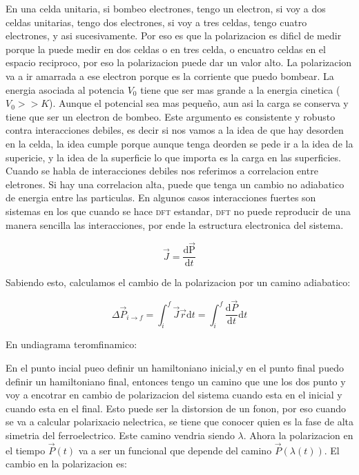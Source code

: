 \documentclass[11pt,fleqn]{book}
\begin{document}
En una celda unitaria, si bombeo electrones, tengo un electron, si voy a dos celdas unitarias, tengo dos electrones, si voy a tres celdas, tengo cuatro electrones, y asi sucesivamente. Por eso es que la polarizacion es dificl de medir porque la puede medir en dos celdas o  en tres celda, o encuatro celdas en el espacio reciproco, por eso la polarizacion puede dar un valor alto.  La polarizacion va a ir amarrada a ese electron porque es la corriente que puedo bombear. La energia asociada al potencia $V_{0}$ tiene que ser mas grande a la energia cinetica ($V_{0}>>K$). Aunque el potencial sea mas pequeño, aun asi la carga se conserva y tiene que ser un electron de bombeo. Este argumento es consistente y robusto contra interacciones debiles, es decir si nos vamos a la idea de que hay desorden en la celda, la idea cumple porque aunque tenga deorden se pede ir a la idea de la supericie, y la idea de la superficie lo que importa es la carga en las superficies. Cuando se habla de interacciones debiles nos referimos a correlacion entre eletrones. Si hay  una correlacion alta, puede que tenga un cambio no adiabatico de energia entre las particulas. En algunos casos interacciones fuertes son sistemas en los que cuando se hace \textsc{dft} estandar, \textsc{dft} no puede reproducir de una manera  sencilla las interacciones, por ende la estructura electronica del sistema.

\begin{equation}
    \vec{J}=\frac{\mathrm{d\vec{P}}}{\mathrm{d}t}
\end{equation}

Sabiendo esto, calculamos el cambio de la polarizacion por un camino adiabatico:

\begin{equation}
    \Delta\vec{P}_{i\rightarrow f}=\int_{i}^{f}\vec{J}\vec{r}\mathrm{d}t=\int_{i}^{f}\frac{\mathrm{d}\vec{P}}{\mathrm{d}t}\mathrm{d}t
\end{equation}  

En undiagrama teromfinamico:


En el punto incial pueo definir un hamiltoniano inicial,y en el punto final puedo definir un hamiltoniano final, entonces tengo un camino que une los dos punto y voy a encotrar en cambio de polarizacion del sistema cuando esta en el inicial y cuando esta en el final. Esto puede ser la distorsion de un fonon, por eso cuando se va a calcular polarixacio nelectrica, se tiene que conocer quien es la fase de alta simetria del ferroelectrico. Este camino vendria siendo $\lambda$. Ahora la polarizacion en el tiempo $\vec{P}(t)$ va a ser un funcional que depende del camino $\vec{P}\left(\lambda(t)\right)$. El cambio en la polarizacion es:
\end{document}
